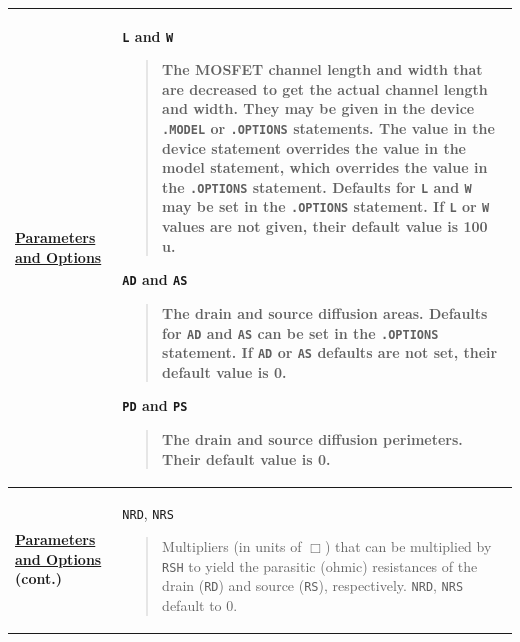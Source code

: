\begin{longtable}[Hh]{>{\setlength{\hsize}{.4\hsize}}YY}
\underline{\bf Parameters} \underline{\bf and Options} &
\texttt{L} and \texttt{W}
\begin{quote}
  The MOSFET channel length and width that are decreased to get the actual
  channel length and width. They may be given in the device \texttt{.MODEL} or
  \texttt{.OPTIONS} statements. The value in the device statement overrides the
  value in the model statement, which overrides the value in the
  \texttt{.OPTIONS} statement. Defaults for \texttt{L} and \texttt{W} may be
  set in the \texttt{.OPTIONS} statement. If \texttt{L} or \texttt{W} values
  are not given, their default value is 100 u.
\end{quote}
\texttt{AD} and \texttt{AS}
\begin{quote}
  The drain and source diffusion areas. Defaults for \texttt{AD} and
  \texttt{AS} can be set in the \texttt{.OPTIONS} statement.  If \texttt{AD} or
  \texttt{AS} defaults are not set, their default value is 0.
\end{quote}
\texttt{PD} and \texttt{PS}
\begin{quote}
  The drain and source diffusion perimeters. Their default value is 0.
\end{quote}
\\ \hline
\underline{\bf Parameters} \underline{\bf and Options} \bf (cont.) &
\texttt{NRD}, \texttt{NRS} 
\begin{quote}
  Multipliers (in units of $\Box$) that can be multiplied by \texttt{RSH}
  to yield the parasitic (ohmic) resistances of the drain (\texttt{RD})
  and source (\texttt{RS}), respectively.  \texttt{NRD}, \texttt{NRS}
  default to 0.


\end{quote}
\end{longtable}
